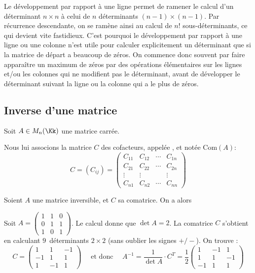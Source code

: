\documentclass[class=report,crop=false]{standalone}
\begin{document}
\begin{remarque*}
Le développement par rapport à une ligne permet de ramener
le calcul d'un déterminant $n\times n$ à celui de $n$ déterminants
$(n-1)\times(n-1)$. Par récurrence descendante, on se ramène
ainsi au calcul de $n!$ sous-déterminants, ce qui devient vite fastidieux.
C'est pourquoi le développement par rapport à une ligne ou une
colonne  n'est utile pour calculer explicitement un déterminant que
si la matrice de départ a beaucoup de zéros.
On commence donc souvent par faire apparaître
un maximum de zéros par des opérations élémentaires sur les lignes et/ou les colonnes
qui ne modifient pas le déterminant,
avant de développer le déterminant suivant la ligne ou la colonne qui a le plus de zéros.
\end{remarque*}

\subsection{Inverse d'une matrice}

Soit $A \in M_n(\Kk)$ une matrice carrée.

Nous lui associons la matrice $C$ des cofacteurs, appelée , et notée
$\mathrm{Com}(A)$:
$$C = (C_{ij}) = \left(
\begin{array}{cccc}
C_{11} & C_{12} & \cdots & C_{1n}\\
C_{21} & C_{22} & \cdots & C_{2n}\\
\vdots & \vdots & & \vdots\\
C_{n1} & C_{n2} & \cdots & C_{nn}
\end{array}\right)
$$

\begin{theoreme}
Soient $A$ une matrice inversible, et $C$ sa comatrice.
On a alors
\end{theoreme}

\begin{exemple}
Soit $\displaystyle A = \left(
\begin{array}{ccc}
1 & 1 & 0\\
0 & 1 & 1\\
1 & 0 & 1
\end{array}\right)$.
Le calcul donne que $\det A = 2$. La comatrice $C$
s'obtient en calculant $9$~déterminants
$2\times 2$ (sans oublier les signes $+/-$). On trouve :
$$C = \begin{pmatrix}
1 & 1 & -1\\
-1 & 1 & 1\\
1 & -1 & 1
      \end{pmatrix}
\quad \text{ et donc } \quad
A^{-1} = \frac{1}{\det A} \cdot C^T = \frac{1}{2}
\begin{pmatrix}
1 & -1 & 1\\
1 & 1 & -1\\
-1 & 1 & 1
\end{pmatrix}
$$
\end{exemple}
\end{document}
